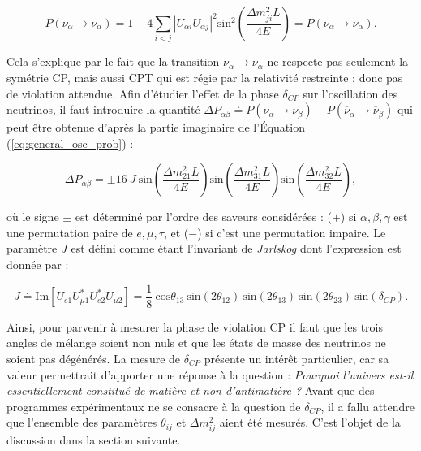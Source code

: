 \begin{equation}
    P(\nu_\alpha \rightarrow \nu_\alpha) = 1 - 4 \sum_{i < j} \left| U_{\alpha i} U_{\alpha j}\right|^2 \textrm{sin}^2\left(\frac{\Delta m_{ji}^2 L}{4E} \right) = P(\overline{\nu}_\alpha \rightarrow \overline{\nu}_\alpha).
\end{equation}

\bigbreak

Cela s'explique par le fait que la transition $\nu_\alpha \rightarrow \nu_\alpha$ ne respecte pas seulement la symétrie CP, mais aussi CPT qui est régie par la relativité restreinte : donc pas de violation attendue. Afin d'étudier l'effet de la phase $\delta_{CP}$ sur l'oscillation des neutrinos, il faut introduire la quantité $\Delta P_{\alpha\beta} \doteq P(\nu_\alpha \rightarrow \nu_\beta ) - P(\overline{\nu}_\alpha \rightarrow \overline{\nu}_\beta )$ qui peut être obtenue d'après la partie imaginaire de l'Équation (\ref{eq:general_osc_prob}) \cite{Giganti:2017fhf} :

\begin{equation}
    \Delta P_{\alpha\beta} = \pm 16\ J\  \textrm{sin}\left(\frac{\Delta m_{21}^2 L}{4E} \right) \textrm{sin}\left(\frac{\Delta m_{31}^2 L}{4E} \right) \textrm{sin}\left(\frac{\Delta m_{32}^2 L}{4E} \right),
\end{equation}

\bigbreak

où le signe $\pm$ est déterminé par l'ordre des saveurs considérées : ($+$) si $\alpha, \beta, \gamma$ est une permutation paire de $e,\mu, \tau$, et ($-$) si c'est une permutation impaire. Le paramètre $J$ est défini comme étant l'invariant de \og \textit{Jarlskog} \fg{} dont l'expression est donnée par :

\begin{equation}
    J \doteq \textrm{Im}\left[U_{e1}U_{\mu 1}^* U_{e2}^* U_{\mu 2}\right] = \frac{1}{8}\ \textrm{cos}\theta_{13}\ \textrm{sin}(2\theta_{12})\ \textrm{sin}(2\theta_{13})\ \textrm{sin}(2\theta_{23})\ \textrm{sin}(\delta_{CP}).
\end{equation}

\bigbreak

Ainsi, pour parvenir à mesurer la phase de violation CP il faut que les trois angles de mélange soient non nuls et que les états de masse des neutrinos ne soient pas dégénérés. La mesure de $\delta_{CP}$ présente un intérêt particulier, car sa valeur permettrait d'apporter une réponse à la question : \textit{Pourquoi l'univers est-il essentiellement constitué de matière et non d'antimatière ?} Avant que des programmes expérimentaux ne se consacre à la question de $\delta_{CP}$, il a fallu attendre que l'ensemble des paramètres $\theta_{ij}$ et $\Delta m_{ij}^2$ aient été mesurés. C'est l'objet de la discussion dans la section suivante.

